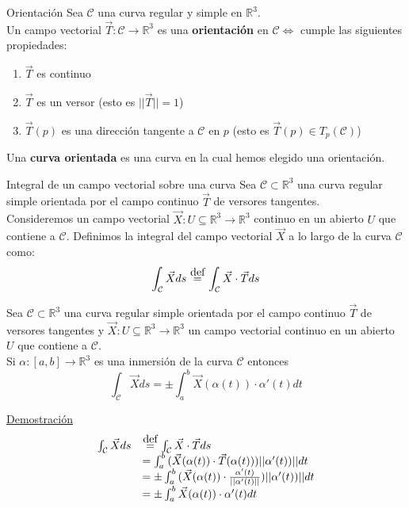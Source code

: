 \documentclass{report}
\newcommand\defeq{\stackrel{\mathclap{\normalfont\mbox{def}}}{~=~}}
\newcommand\reals{\mathds{R}}
\begin{document}
\begin{defbox}{Orientación}
	Sea $\mathcal{C}$ una curva regular y simple en $\reals^3$. \\
	Un campo vectorial $\vec{T}: \mathcal{C} \rightarrow \reals^3$ es una \textbf{orientación} en $\mathcal{C} \iff$ cumple las siguientes propiedades:
	\begin{enumerate}
		\item $\vec{T}$ es continuo \\
		\item $\vec{T}$ es un versor (esto es $||\vec{T}||=1$) \\
		\item $\vec{T}(p)$ es una dirección tangente a $\mathcal{C}$ en $p$ (esto es $\vec{T}(p)\in T_p(\mathcal{C})$)
	\end{enumerate}
	Una \textbf{curva orientada} es una curva en la cual hemos elegido una orientación.
\end{defbox}

\begin{defbox}{Integral de un campo vectorial sobre una curva}
	Sea $\mathcal{C} \subset \reals^3$ una curva regular simple orientada por el campo continuo $\vec{T}$ de versores tangentes. \\
	Consideremos un campo vectorial $\vec{X}: U \subseteq \reals^3 \rightarrow \reals^3$ continuo en un abierto $U$ que contiene a $\mathcal{C}$. Definimos la integral del campo vectorial $\vec{X}$ a lo largo de la curva $\mathcal{C}$ como:
	\[
		\int_{\mathcal{C}}{\vec{X}ds} \defeq \int_{\mathcal{C}}{\vec{X}\cdot\vec{T}ds}
	\]
\end{defbox}

\begin{propobox}
	Sea $\mathcal{C} \subset \reals^3$ una curva regular simple orientada por el campo continuo $\vec{T}$ de versores tangentes y $\vec{X}:U\subseteq\reals^3 \rightarrow\reals^3$ un campo vectorial continuo en un abierto $U$ que contiene a $\mathcal{C}$. \\
	Si $\alpha :[a,b] \rightarrow \reals^3$ es una inmersión de la curva $\mathcal{C}$ entonces
	\begin{equation}
		\boxed{
		\int_{\mathcal{C}}{\vec{X}ds} = \pm \int_a^b{\vec{X}(\alpha (t))\cdot \alpha '(t)dt}
		}
		\label{eq:int_c_vec}
	\end{equation}
\end{propobox}
\underline{Demostración} \\
\[
	\begin{array}{ll}
		\int_{\mathcal{C}}{\vec{X}ds} & \defeq \int_{\mathcal{C}}{\vec{X}\cdot\vec{T}ds}                                                \\
		                              & = \int_a^b{(\vec{X}(\alpha (t))\cdot \vec{T}(\alpha (t)))||\alpha '(t))||dt}                    \\
		                              & =\pm \int_a^b{(\vec{X}(\alpha (t))\cdot \frac{\alpha '(t)}{||\alpha '(t)||})||\alpha '(t))||dt} \\
		                              & = \pm \int_a^b{\vec{X}(\alpha (t))\cdot \alpha '(t)dt}
	\end{array}
\]
\end{document}
